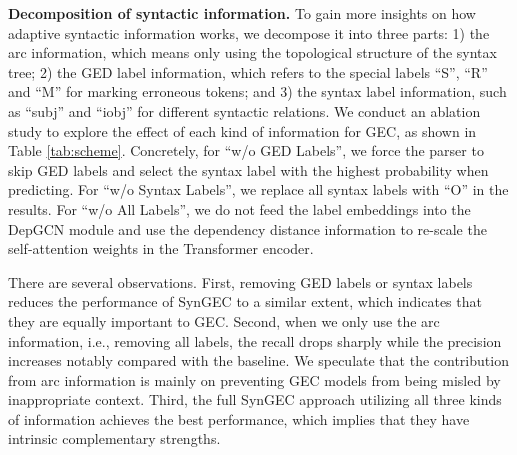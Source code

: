 \documentclass[11pt]{article}
\begin{document}
\textbf{Decomposition of syntactic information.} To gain more insights on how adaptive syntactic information works, we decompose it into three parts: 1) the arc information, which means only using the topological structure of the syntax tree; 2) the GED label information, which refers to the special labels ``S'', ``R'' and ``M'' for marking erroneous tokens; and 3) the syntax label information, such as ``subj'' and ``iobj'' for different syntactic relations. We conduct an ablation study to explore the effect of each kind of information for GEC, as shown in Table \ref{tab:scheme}. Concretely, for ``w/o GED Labels'', we force the parser to skip GED labels and select the syntax label with the highest probability when predicting. For ``w/o Syntax Labels'', we replace all syntax labels with ``O'' in the results. For ``w/o All Labels'', we do not feed the label embeddings into the DepGCN module and use the dependency distance information to re-scale the self-attention weights in the Transformer encoder.

There are several observations. First, removing GED labels or syntax labels reduces the performance of SynGEC to a similar extent, which indicates that they are equally important to GEC. 
Second, when we only use the arc information, i.e., removing all labels, the recall drops sharply while the precision increases notably compared with the baseline. We speculate that the contribution from arc information is mainly on preventing GEC models from being misled by inappropriate context. 
Third, the full SynGEC approach utilizing all three kinds of information achieves the best performance, which implies that they have intrinsic complementary strengths. 
\end{document}
